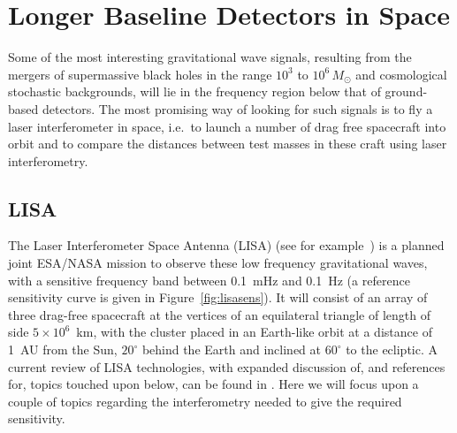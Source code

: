 \documentclass{article}
\begin{document}

\newpage

\section{Longer Baseline Detectors in Space}
\label{section:space}

Some of the most interesting gravitational wave signals, resulting from the
mergers of supermassive black holes in the range $10^3$ to $10^{6}\,M_{\odot}$
and cosmological stochastic backgrounds, will lie in the frequency region below
that of ground-based detectors. The most promising way of looking for such
signals is to fly a laser interferometer in space, i.e.\ to launch a number of
drag free spacecraft into orbit and to compare the distances between test
masses in these craft using laser interferometry.

\subsection{LISA}

The Laser Interferometer Space Antenna (LISA) (see
for example~\cite{LISAsymposium, NASAweb, ESAweb}) is a planned joint ESA/NASA
mission to observe these low frequency gravitational waves, with a sensitive
frequency band between 0.1~mHz and 0.1~Hz (a reference sensitivity curve is
given in Figure~\ref{fig:lisasens}). It will consist of an array of three drag-free
spacecraft at the vertices of an equilateral triangle of length of side
$5\times10^6$~km, with the cluster placed in an Earth-like orbit at a distance
of 1~AU from the Sun, $20^{\circ}$ behind the Earth and inclined at $60^{\circ}$
to the ecliptic. A current review of LISA technologies, with expanded discussion
of, and references for, topics touched upon below, can be found in
\cite{Jennrich:2009}. Here we will focus upon a couple of topics regarding the
interferometry needed to give the required sensitivity.
\end{document}
